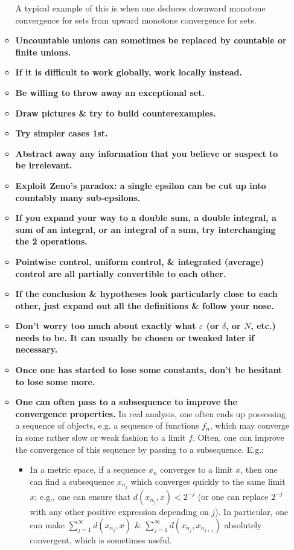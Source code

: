 \documentclass{article}
\begin{document}
\begin{enumerate}
\begin{itemize}
		A typical example of this is when one deduces downward monotone convergence for sets from upward monotone convergence for sets.
		\item {\bf Uncountable unions can sometimes be replaced by countable or finite unions.}
		\item {\bf If it is difficult to work globally, work locally instead.}
		\item {\bf Be willing to throw away an exceptional set.}
		\item {\bf Draw pictures \& try to build counterexamples.}
		\item {\bf Try simpler cases 1st.}
		\item {\bf Abstract away any information that you believe or suspect to be irrelevant.}
		\item {\bf Exploit Zeno's paradox: a single epsilon can be cut up into countably many sub-epsilons.}
		\item {\bf If you expand your way to a double sum, a double integral, a sum of an integral, or an integral of a sum, try interchanging the 2 operations.}
		\item {\bf Pointwise control, uniform control, \& integrated (average) control are all partially convertible to each other.}
		\item {\bf If the conclusion \& hypotheses look particularly close to each other, just expand out all the definitions \& follow your nose.}
		\item {\bf Don't worry too much about exactly what $\varepsilon$ (or $\delta$, or $N$, etc.) needs to be. It can usually be chosen or tweaked later if necessary.}
		\item {\bf Once one has started to lose some constants, don't be hesitant to lose some more.}
		\item {\bf One can often pass to a subsequence to improve the convergence properties.} In real analysis, one often ends up possessing a sequence of objects, e.g. a sequence of functions $f_n$, which may converge in some rather slow or weak fashion to a limit $f$. Often, one can improve the convergence of this sequence by passing to a subsequence. E.g.:
		\begin{itemize}
			\item In a metric space, if a sequence $x_n$ converges to a limit $x$, then one can find a subsequence $x_{n_j}$ which converges quickly to the same limit $x$; e.g., one can ensure that $d(x_{n_j},x) < 2^{-j}$ (or one can replace $2^{-j}$ with any other positive expression depending on $j$). In particular, one can make $\sum_{j=1}^\infty d(x_{n_j},x)$ \& $\sum_{j=1}^\infty d(x_{n_j},x_{n_{j+1}})$ absolutely convergent, which is sometimes useful.

\end{itemize}
\end{itemize}
\end{enumerate}
\end{document}
